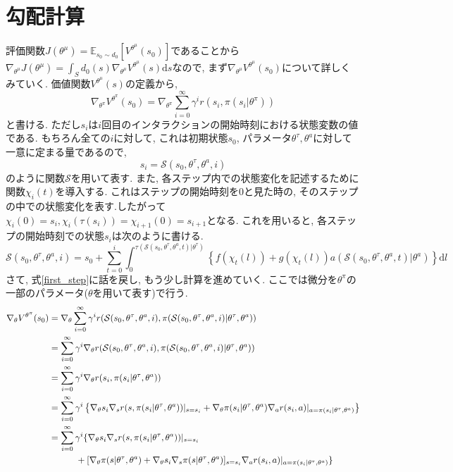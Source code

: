\documentclass{jsarticle}
\newcommand{\expect}{\mathbb{E}}
\begin{document}
\section{勾配計算}
評価関数$J(\theta^{\mu})=\expect_{s_0\sim d_0}[V^{\theta^{\mu}}(s_0)]$であることから$\nabla_{\theta^{\mu}}J(\theta^{\mu})=\int_{S}d_0(s)\nabla_{\theta^{\mu}}V^{\theta^{\mu}}(s)\textrm{d}s$なので, まず$\nabla_{\theta^{\mu}}V^{\theta^{\mu}}(s_0)$について詳しくみていく. 価値関数$V^{\theta^{\mu}}(s)$の定義から, 
\begin{equation}
	\nabla_{\theta^{\pi}}V^{\theta^{\pi}}(s_0) = \nabla_{\theta^{\pi}}\sum_{i=0}^{\infty}\gamma^{i}r(s_i, \pi(s_i|\theta^{\pi}))\label{first_step}
\end{equation}
と書ける. ただし$s_i$は$i$回目のインタラクションの開始時刻における状態変数の値である. もちろん全ての$i$に対して, これは初期状態$s_0$, パラメータ$\theta^{\tau}, \theta^a$に対して一意に定まる量であるので, 
\begin{equation}
	s_i = \mathcal{S}(s_0, \theta^{\tau}, \theta^{a}, i)
\end{equation}
のように関数$\mathcal{S}$を用いて表す. また, 各ステップ内での状態変化を記述するために関数$\chi_i(t)$を導入する. これはステップの開始時刻を0と見た時の, そのステップの中での状態変化を表す.したがって$\chi_i(0) = s_i, \chi_i(\tau(s_i))=\chi_{i+1}(0)=s_{i+1}$となる. これを用いると, 各ステップの開始時刻での状態$s_i$は次のように書ける.
\begin{equation}
	\mathcal{S}(s_0, \theta^{\tau}, \theta^{a}, i) = s_0 + \sum_{t=0}^{i}\int_{0}^{\tau(\mathcal{S}(s_0, \theta^{\tau}, \theta^{a}, t)|\theta^{\tau})}\left\{f(\chi_t(l))+g(\chi_t(l))a(\mathcal{S}(s_0, \theta^{\tau}, \theta^{a}, t)|\theta^a)\right\}\textrm{d}l \label{step_state}
\end{equation}
さて, 式\eqref{first_step}に話を戻し, もう少し計算を進めていく. ここでは微分を$\theta^{\pi}$の一部のパラメータ($\theta$を用いて表す)で行う.
\begin{align}
	\nabla_{\theta}V^{\theta^{\pi}}(s_0) &= \nabla_{\theta}\sum_{i=0}^{\infty}\gamma^{i}r(\mathcal{S}(s_0, \theta^{\tau}, \theta^{a}, i), \pi(\mathcal{S}(s_0, \theta^{\tau}, \theta^{a}, i)|\theta^{\tau}, \theta^a)) \\
	&= \sum_{i=0}^{\infty}\gamma^{i}\nabla_{\theta}r(\mathcal{S}(s_0, \theta^{\tau}, \theta^{a}, i), \pi(\mathcal{S}(s_0, \theta^{\tau}, \theta^{a}, i)|\theta^{\tau}, \theta^a)) \\
	&= \sum_{i=0}^{\infty}\gamma^{i}\nabla_{\theta}r(s_i, \pi(s_i|\theta^{\tau}, \theta^a))\\
	&= \sum_{i=0}^{\infty}\gamma^{i}\left\{\nabla_{\theta}s_i\nabla_{s}r(s, \pi(s_i|\theta^{\tau}, \theta^a))|_{s=s_i}+\nabla_{\theta}\pi(s_i|\theta^{\tau}, \theta^a)\nabla_{a}r(s_i, a)|_{a=\pi(s_i|\theta^{\tau}, \theta^a)}\right\}\\
	&= \sum_{i=0}^{\infty}\gamma^{i}\{\nabla_{\theta}s_i\nabla_{s}r(s, \pi(s_i|\theta^{\tau}, \theta^a))|_{s=s_i}\\
	&\hspace{7ex}+[\nabla_{\theta}\pi(s|\theta^{\tau}, \theta^a)+\nabla_{\theta}s_i\nabla_{s}\pi(s|\theta^{\tau}, \theta^a)]_{s=s_i}\nabla_{a}r(s_i, a)|_{a=\pi(s_i|\theta^{\tau}, \theta^a)}\}\label{devide_grad}
\end{align}
\end{document}
